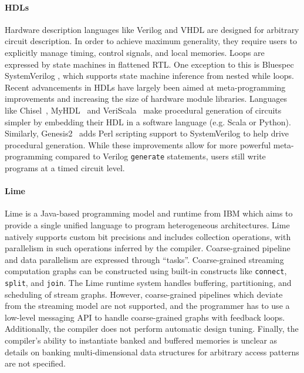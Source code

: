 \paragraph{HDLs}
Hardware description languages like Verilog and VHDL are designed for arbitrary circuit description. In order to achieve maximum generality, they require users to explicitly manage timing, control signals, and local memories. Loops are expressed by state machines in flattened RTL. 
One exception to this is Bluespec SystemVerilog \cite{bluespec}, which supports state machine inference from nested while loops.
Recent advancements in HDLs have largely been aimed at meta-programming improvements and increasing the size of hardware module libraries.
Languages like Chisel~\cite{chisel}, MyHDL~\cite{myhdl} and VeriScala~\cite{veriscala} make procedural generation of circuits simpler by embedding their HDL in a software language (e.g. Scala or Python). Similarly, Genesis2~\cite{genesis2} adds Perl scripting support to SystemVerilog to help drive procedural generation. While these improvements allow for more powerful meta-programming compared to Verilog \texttt{\small{generate}} statements, users still write programs at a timed circuit level.


\paragraph{Lime}
Lime is a Java-based programming model and runtime from IBM which aims to provide a single unified language to program heterogeneous architectures. Lime natively supports custom bit precisions and includes collection operations, with parallelism in such operations inferred by the compiler. Coarse-grained pipeline and data parallelism are expressed through ``tasks''. Coarse-grained streaming computation graphs can be constructed using built-in constructs like \texttt{\small{connect}}, \texttt{\small{split}}, and \texttt{\small{join}}. The Lime runtime system handles buffering, partitioning, and scheduling of stream graphs. However, coarse-grained pipelines which deviate from the streaming model are not supported, and the programmer has to use a low-level messaging API to handle coarse-grained graphs with feedback loops. Additionally, the compiler does not perform automatic design tuning. Finally, the compiler's ability to instantiate banked and buffered memories is unclear as details on banking multi-dimensional data structures for arbitrary access patterns are not specified. 


